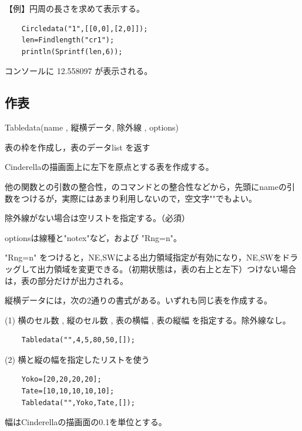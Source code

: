 \documentclass[papersize,a4paper,12pt,uplatex]{jsarticle}
\begin{document}
\begin{description}
\begin{description}
\vspace{\baselineskip}
【例】円周の長さを求めて表示する。
\begin{verbatim}
    Circledata("1",[[0,0],[2,0]]);
    len=Findlength("cr1");
    println(Sprintf(len,6)); 
\end{verbatim}

コンソールに 12.558097 が表示される。



\end{description}
\newpage
\subsection{作表}

\begin{description}

\hypertarget{tabledata}{}
\item[関数]  Tabledata(name , 縦横データ, 除外線 , options)
\item[機能]  表の枠を作成し，表のデータlist を返す
\item[説明]  Cinderellaの描画面上に左下を原点とする表を作成する。

他の関数との引数の整合性，\ketpic のコマンドとの整合性などから，先頭にnameの引数をつけるが，実際にはあまり利用しないので，空文字""でもよい。

除外線がない場合は空リストを指定する。（必須）

optionsは線種と"notex"など，および "Rng=n"。

"Rng=n" をつけると，NE,SWによる出力領域指定が有効になり，NE,SWをドラッグして出力領域を変更できる。（初期状態は，表の右上と左下）つけない場合は，表の部分だけが出力される。

縦横データには，次の2通りの書式がある。いずれも同じ表を作成する。

\vspace{\baselineskip}
(1) 横のセル数 , 縦のセル数 , 表の横幅 , 表の縦幅  を指定する。除外線なし。

\begin{verbatim}
    Tabledata("",4,5,80,50,[]);
\end{verbatim}
  
(2) 横と縦の幅を指定したリストを使う
\begin{verbatim}
    Yoko=[20,20,20,20];
    Tate=[10,10,10,10,10];
    Tabledata("",Yoko,Tate,[]);
 \end{verbatim}

幅はCinderellaの描画面の0.1を単位とする。


\end{description}
\end{description}
\end{document}
